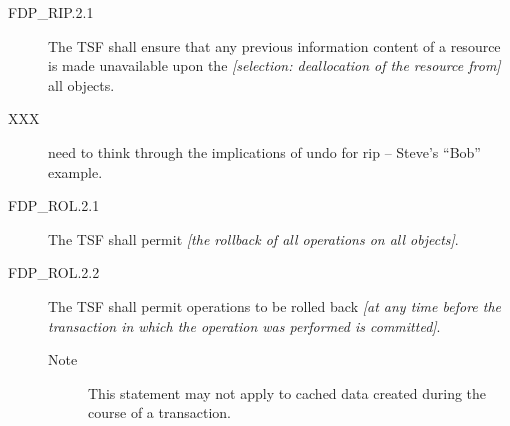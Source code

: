 \documentclass[12pt,english]{scrbook}
\begin{document}



\begin{description}
\item[FDP{\_}RIP.2.1]

The TSF shall ensure that any previous information content of a
resource is made unavailable upon the \emph{{[}selection: deallocation of
the resource from]} all objects.

\item[XXX ]

need to think through the implications of undo for rip -- Steve's
``Bob'' example.

\end{description}





\begin{description}
\item[FDP{\_}ROL.2.1 ]

The TSF shall permit \emph{{[}the rollback of all
operations on all objects]}.

\item[FDP{\_}ROL.2.2 ]

The TSF shall permit operations to be rolled
back \emph{{[}at any time before the transaction in which the operation was
performed is committed]}.
\begin{description}
\item[Note ]

This statement may not apply to cached data created
during the course of a transaction.

\end{description}

\end{description}
\end{document}

